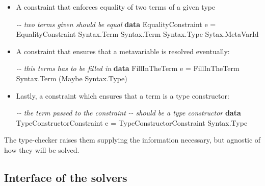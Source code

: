 \documentclass[
  sigconf,
  screen,
  review]{acmart}
\newenvironment{Shaded}{}{}
\newcommand{\CommentTok}[1]{\textcolor[rgb]{0.38,0.63,0.69}{\textit{#1}}}
\newcommand{\DataTypeTok}[1]{\textcolor[rgb]{0.56,0.13,0.00}{#1}}
\newcommand{\KeywordTok}[1]{\textcolor[rgb]{0.00,0.44,0.13}{\textbf{#1}}}
\newcommand{\NormalTok}[1]{#1}
\newcommand{\OtherTok}[1]{\textcolor[rgb]{0.00,0.44,0.13}{#1}}
\begin{document}
\begin{itemize}
\item
  A constraint that enforces equality of two terms of a given type

\begin{Shaded}
\begin{Highlighting}[]
\CommentTok{{-}{-} two terms given should be equal}
\KeywordTok{data} \DataTypeTok{EqualityConstraint}\NormalTok{ e }\OtherTok{=}
     \DataTypeTok{EqualityConstraint} \DataTypeTok{Syntax.Term} \DataTypeTok{Syntax.Term}
                        \DataTypeTok{Syntax.Type}
                        \DataTypeTok{Sytax.MetaVarId}
\end{Highlighting}
\end{Shaded}
\item
  A constraint that ensures that a metavariable is resolved eventually:

\begin{Shaded}
\begin{Highlighting}[]
\CommentTok{{-}{-} this terms has to be filled in}
\KeywordTok{data} \DataTypeTok{FillInTheTerm}\NormalTok{ e }\OtherTok{=}
     \DataTypeTok{FillInTheTerm} \DataTypeTok{Syntax.Term}
\NormalTok{                   (}\DataTypeTok{Maybe} \DataTypeTok{Syntax.Type}\NormalTok{)}
\end{Highlighting}
\end{Shaded}
\item
  Lastly, a constraint which ensures that a term is a type constructor:

\begin{Shaded}
\begin{Highlighting}[]
\CommentTok{{-}{-} the term passed to the constraint}
\CommentTok{{-}{-} should be a type constructor}
\KeywordTok{data} \DataTypeTok{TypeConstructorConstraint}\NormalTok{ e }\OtherTok{=}
     \DataTypeTok{TypeConstructorConstraint} \DataTypeTok{Syntax.Type}
\end{Highlighting}
\end{Shaded}
\end{itemize}

The type-checker raises them supplying the information necessary, but
agnostic of how they will be solved.

\hypertarget{sec:solvers-interface}{%
\subsection{Interface of the solvers}\label{sec:solvers-interface}}
\end{document}
